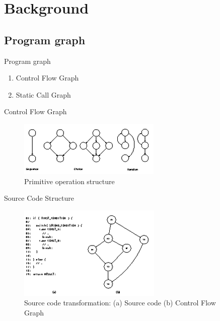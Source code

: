 \documentclass{beamer}
\begin{document}
%
\section{Background}
\subsection{Program graph}
\begin{frame}{Program graph}
    \begin{enumerate}
        \item Control Flow Graph
        \item Static Call Graph
    \end{enumerate}
\end{frame}


\begin{frame}{Control Flow Graph}
    \begin{figure}
        \includegraphics[width=.8\paperwidth]{figure/Primitive-Operation-Structure}
        \caption{Primitive operation structure \parencite{McCabe1976}}
        \label{fig:primitivestructure}
    \end{figure}
\end{frame}

\begin{frame}{Source Code Structure}
    \begin{figure}
        \includegraphics[height=.7\paperheight]{figure/cfg-transform}
        \caption{Source code transformation: (a) Source code (b) Control Flow Graph}
        \label{fig:sourceCodeTransf}
    \end{figure}
\end{frame}
\end{document}

